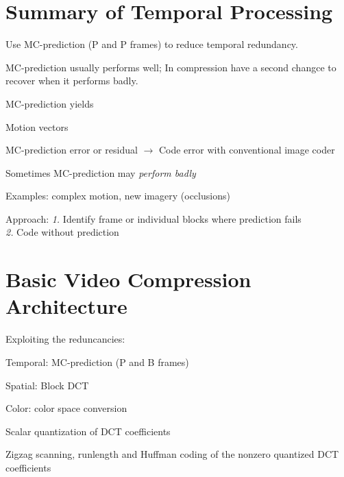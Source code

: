 \begin{compactdesc}
\section{Summary of Temporal Processing}
	\begin{enumerate*}[label=\protect\circled{\arabic*},itemjoin=]
		\item Use MC-prediction (P and P frames) to reduce temporal redundancy.\\
		\item MC-prediction usually performs well; In compression have a second changce to recover when it performs badly.\\
		\item MC-prediction yields\\
			\begin{enumerate*}[label=\quad\protect\circled{\alph*},itemjoin=]
				\item Motion vectors\\
				\item MC-prediction error or residual $\to$ Code error with conventional image coder\\
			\end{enumerate*}
		\item Sometimes MC-prediction may \emph{perform badly}\\
			\begin{enumerate*}[label=\quad\protect\circled{\alph*},itemjoin=]
				\item Examples: complex motion, new imagery (occlusions)\\
				\item Approach: \emph{1.} Identify frame or individual blocks where prediction fails \\
					\emph{2.} Code without prediction
			\end{enumerate*}
	\end{enumerate*}
	\section{Basic Video Compression Architecture}
	\begin{enumerate*}[label=\protect\circled{\arabic*},itemjoin=]
		\item Exploiting the reduncancies:
			\begin{enumerate*}[label=\quad\protect\circled{\alph*},itemjoin=]
				\item Temporal: MC-prediction (P and B frames)\\
				\item Spatial: Block DCT\\
				\item Color: color space conversion
			\end{enumerate*}
		\item Scalar quantization of DCT coefficients\\
		\item Zigzag scanning, runlength and Huffman coding of the nonzero quantized DCT coefficients
	\end{enumerate*}
\end{compactdesc}
